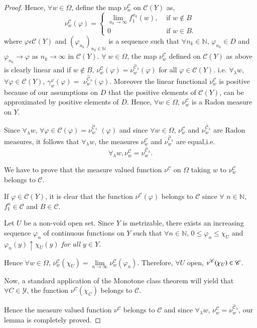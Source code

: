 \begin{proof}
Hence, $\forall w \in \Omega$, define the map $\nu^\mathscr{C}_w$ on
$\mathscr{C}(Y)$ as, 
$$
\nu^{\mathscr{C}}_w (\varphi) = 
\begin{cases}
\lim\limits_{n_k \to \infty} f^{n_k}_1 (w), & \text{ if } w \not\in B\\
0  & \text{ if } w \in B. 
\end{cases}
$$
where $\varphi\epsilon \mathscr{C}(Y)$ and $(\varphi_{n_k})_{n_k \in
  \mathbb{N}}$ is a sequence such that $\forall n_k \in \mathbb{N}$,
$\varphi_{n_k} \in D$ and $\varphi_{n_k} \to \varphi$ as $n_k \to
\infty$ in $\mathscr{C}(Y)$. $\forall \; w \in \Omega$, the map
$\nu^\mathscr{C}_w$ defined on $\mathscr{C}(Y)$ as above is clearly
linear and if $w \not\in B$, $\nu^\mathscr{C}_w (\varphi) =
\nu^{\hat{\mathscr{C}}_\lambda}_w (\varphi)$  for all $\varphi \in
\mathscr{C}(Y)$. i.e. $\forall_\lambda w$, $\forall \varphi \in
\mathscr{C}(Y)$, $\gamma^\varphi_w(\varphi) = $
$\nu^{\hat{\mathscr{C}}_\lambda}_w(\varphi)$. Moreover the linear
functional $\nu^\mathscr{C}_w$ is positive because of our assumptions
on  $D$ that the positive elements of $\mathscr{C}(Y)$, can be
approximated by positive elements of $D$. Hence, $\forall w \in
\Omega$, $\nu^{\mathscr{C}}_w$ is a Radon measure on $Y$. 

Since $\forall_\lambda w$, $\forall \varphi \in \mathscr{C}(\varphi) =
\nu^{\hat{\mathscr{C}}_\lambda}_w$ $(\varphi)$ and since $\forall w
\in \Omega$, $\nu^\mathscr{C}_w$ and
$\nu^{\hat{\mathscr{C}}_\lambda}_w$ are Radon measures, it follows
that $\forall_\lambda w$, the measures $\nu^{\mathscr{C}}_w$ and
$\nu^{\hat{\mathscr{C}}_\lambda}_w$  are equal,\pageoriginale i.e.
$$
\forall_\lambda w, \nu^{\mathscr{C}}_w =
\nu^{\hat{\mathscr{C}}_\lambda}_w. 
$$

We have to prove that the measure valued function $\nu^\mathscr{C}$ on
$\Omega$ taking $w$ to $\nu^\mathscr{C}_w$ belongs to $\mathscr{C}$. 

If $\varphi \in \mathscr{C} (Y)$, it is clear that the function
$\nu^\mathscr{C}(\varphi)$ belongs to $\mathscr{C}$ since $\forall $
$n \in \mathbb{N}$, $f^n_1 \in \mathscr{C}$ and $B \in \mathscr{C}$. 

Let $U$ be a non-void open set. Since $Y$ is metrizable, there exists
an increasing sequence $\varphi_n$ of continuous functions on $Y$ such
that $\forall n \in\mathbb{N}$, $0 \leq \varphi_n \leq \chi_U$ and
$\varphi_n(y) \uparrow \chi_U (y)$ {\em for all $y \in Y$}. 

Hence $\forall w \in \Omega$, $\nu^\mathscr{C}_w (\chi_U) =
\lim\limits_{n \to \infty} \nu^\mathscr{C}_w (\varphi_n)$. Therefore,
$\forall U$ open, $\nu^\mathscr{C}\break(\chi_U) \in \mathscr{C}$. 

Now, a standard application of the Monotone class theorem will yield
that $\forall C \in \mathscr{Y}$, the function
$\nu^\mathscr{C}(\chi_C)$ belongs to $\mathscr{C}$. 

Hence the measure valued function $\nu^\mathscr{C}$ belongs to
$\mathscr{C}$ and since $\forall_\lambda w$, $\nu^\mathscr{C}_w =
\nu^{\hat{\mathscr{C}}_\lambda}_w$, our lemma is completely proved.  
\end{proof}

